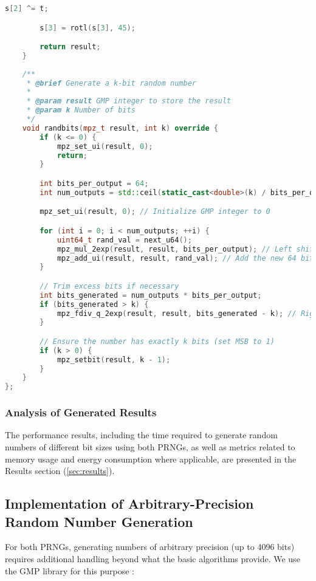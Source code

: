 \begin{lstlisting}[language=C++, caption=Xoshiro256++ Implementation (Header)]
        s[2] ^= t;

        s[3] = rotl(s[3], 45);

        return result;
    }
    
    /**
     * @brief Generate a k-bit random number
     * 
     * @param result GMP integer to store the result
     * @param k Number of bits
     */
    void randbits(mpz_t result, int k) override {
        if (k <= 0) {
            mpz_set_ui(result, 0);
            return;
        }

        int bits_per_output = 64;
        int num_outputs = std::ceil(static_cast<double>(k) / bits_per_output);

        mpz_set_ui(result, 0); // Initialize GMP integer to 0

        for (int i = 0; i < num_outputs; ++i) {
            uint64_t rand_val = next_u64();
            mpz_mul_2exp(result, result, bits_per_output); // Left shift by 64 bits
            mpz_add_ui(result, result, rand_val); // Add the new 64 bits
        }

        // Trim excess bits if necessary
        int bits_generated = num_outputs * bits_per_output;
        if (bits_generated > k) {
            mpz_fdiv_q_2exp(result, result, bits_generated - k); // Right shift
        }

        // Ensure the number has exactly k bits (set MSB to 1)
        if (k > 0) {
            mpz_setbit(result, k - 1);
        }
    }
};
\end{lstlisting}

\subsubsection{Analysis of Generated Results}

The performance results, including the time required to generate random numbers of different bit sizes using both PRNGs, as well as metrics related to memory usage and energy consumption where applicable, are presented in the Results section (\autoref{sec:results}).

\subsection{Implementation of Arbitrary-Precision Random Number Generation}

For both PRNGs, generating numbers of arbitrary precision (up to 4096 bits) requires additional handling beyond what the basic algorithms provide. We use the GMP library for this purpose \cite{granlund2012}:

